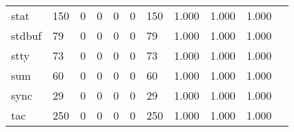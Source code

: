 \begin{longtable}{lp{1.20cm}p{1.20cm}p{1.20cm}p{1.20cm}p{1.20cm}p{1.20cm}p{1.20cm}p{1.20cm}p{1.20cm}p{1.20cm}}
stat      &                                   150 &                                                  0 &                                                  0 &                                                  0 &                                                  0 &                                                150 &                                         1.000 &                                              1.000 &                                              1.000 \\
stdbuf    &                                    79 &                                                  0 &                                                  0 &                                                  0 &                                                  0 &                                                 79 &                                         1.000 &                                              1.000 &                                              1.000 \\
stty      &                                    73 &                                                  0 &                                                  0 &                                                  0 &                                                  0 &                                                 73 &                                         1.000 &                                              1.000 &                                              1.000 \\
sum       &                                    60 &                                                  0 &                                                  0 &                                                  0 &                                                  0 &                                                 60 &                                         1.000 &                                              1.000 &                                              1.000 \\
sync      &                                    29 &                                                  0 &                                                  0 &                                                  0 &                                                  0 &                                                 29 &                                         1.000 &                                              1.000 &                                              1.000 \\
tac       &                                   250 &                                                  0 &                                                  0 &                                                  0 &                                                  0 &                                                250 &                                         1.000 &                                              1.000 &                                              1.000 \\

\end{longtable}
